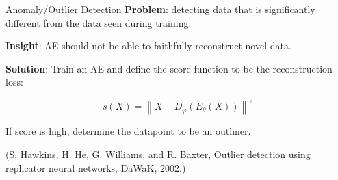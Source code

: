 \begin{frame}[allowframebreaks]

\begin{myconceptblock}{9.7}{Anomaly/Outlier Detection}
    \textbf{Problem}: detecting data that is significantly different from the data seen during training.

    \textbf{Insight}: AE should not be able to faithfully reconstruct novel data.

    \textbf{Solution}: Train an AE and define the score function to be the reconstruction loss:

    $$
    s(X)=\left\|X-D_{\varphi}\left(E_{\theta}(X)\right)\right\|^{2}
    $$

    If score is high, determine the datapoint to be an outliner.

    (S. Hawkins, H. He, G. Williams, and R. Baxter, Outlier detection using replicator neural networks, DaWaK, 2002.)
\end{myconceptblock}

\end{frame}
